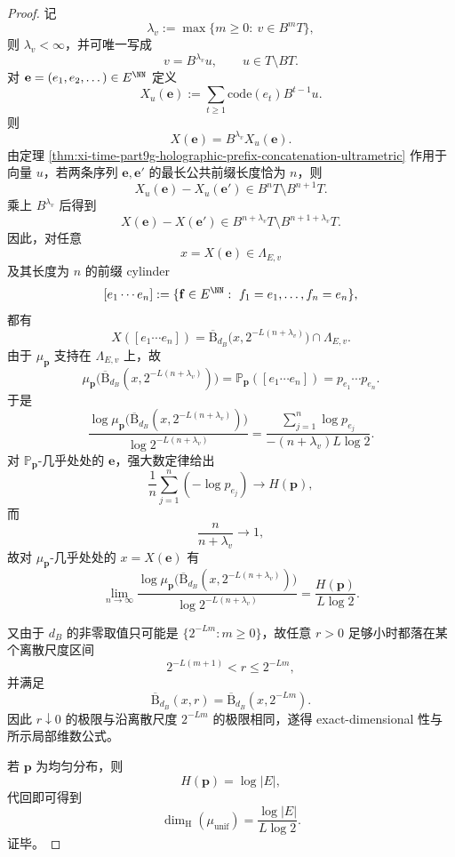 \begin{proof}
记
\[
\lambda_v:=\max\{m\ge 0:\ v\in B^mT\},
\]
则 \(\lambda_v<\infty\)，并可唯一写成
\[
v=B^{\lambda_v}u,
\qquad
u\in T\setminus BT.
\]
对 \(\mathbf e=(e_1,e_2,\dots)\in E^{\NN}\) 定义
\[
X_u(\mathbf e):=\sum_{t\ge 1}\mathrm{code}(e_t)B^{t-1}u.
\]
则
\[
X(\mathbf e)=B^{\lambda_v}X_u(\mathbf e).
\]
由定理 \ref{thm:xi-time-part9g-holographic-prefix-concatenation-ultrametric} 作用于向量 \(u\)，若两条序列 \(\mathbf e,\mathbf e'\) 的最长公共前缀长度恰为 \(n\)，则
\[
X_u(\mathbf e)-X_u(\mathbf e')
\in
B^nT\setminus B^{n+1}T.
\]
乘上 \(B^{\lambda_v}\) 后得到
\[
X(\mathbf e)-X(\mathbf e')
\in
B^{n+\lambda_v}T\setminus B^{n+1+\lambda_v}T.
\]
因此，对任意
\[
x=X(\mathbf e)\in \Lambda_{E,v}
\]
及其长度为 \(n\) 的前缀 cylinder
\[
[e_1\cdots e_n]
:=
\{\mathbf f\in E^{\NN}:\ f_1=e_1,\dots,f_n=e_n\},
\]
都有
\[
X([e_1\cdots e_n])
=
\overline{\mathrm B}_{d_B}\!\bigl(x,2^{-L(n+\lambda_v)}\bigr)\cap \Lambda_{E,v}.
\]
由于 \(\mu_{\mathbf p}\) 支持在 \(\Lambda_{E,v}\) 上，故
\[
\mu_{\mathbf p}\!\bigl(\overline{\mathrm B}_{d_B}(x,2^{-L(n+\lambda_v)})\bigr)
=
\mathbb P_{\mathbf p}([e_1\cdots e_n])
=
p_{e_1}\cdots p_{e_n}.
\]
于是
\[
\frac{
\log \mu_{\mathbf p}\!\bigl(\overline{\mathrm B}_{d_B}(x,2^{-L(n+\lambda_v)})\bigr)
}{
\log 2^{-L(n+\lambda_v)}
}
=
\frac{
\sum_{j=1}^{n}\log p_{e_j}
}{
-(n+\lambda_v)L\log 2
}.
\]
对 \(\mathbb P_{\mathbf p}\)-几乎处处的 \(\mathbf e\)，强大数定律给出
\[
\frac1n\sum_{j=1}^{n}(-\log p_{e_j})\to H(\mathbf p),
\]
而
\[
\frac{n}{n+\lambda_v}\to 1,
\]
故对 \(\mu_{\mathbf p}\)-几乎处处的 \(x=X(\mathbf e)\) 有
\[
\lim_{n\to\infty}
\frac{
\log \mu_{\mathbf p}\!\bigl(\overline{\mathrm B}_{d_B}(x,2^{-L(n+\lambda_v)})\bigr)
}{
\log 2^{-L(n+\lambda_v)}
}
=
\frac{H(\mathbf p)}{L\log 2}.
\]

又由于 \(d_B\) 的非零取值只可能是 \(\{2^{-Lm}:m\ge 0\}\)，故任意 \(r>0\) 足够小时都落在某个离散尺度区间
\[
2^{-L(m+1)}<r\le 2^{-Lm},
\]
并满足
\[
\overline{\mathrm B}_{d_B}(x,r)=\overline{\mathrm B}_{d_B}(x,2^{-Lm}).
\]
因此 \(r\downarrow 0\) 的极限与沿离散尺度 \(2^{-Lm}\) 的极限相同，遂得 exact-dimensional 性与所示局部维数公式。

若 \(\mathbf p\) 为均匀分布，则
\[
H(\mathbf p)=\log |E|,
\]
代回即可得到
\[
\dim_{\mathrm H}(\mu_{\mathrm{unif}})
=
\frac{\log |E|}{L\log 2}.
\]
证毕。
\end{proof}

